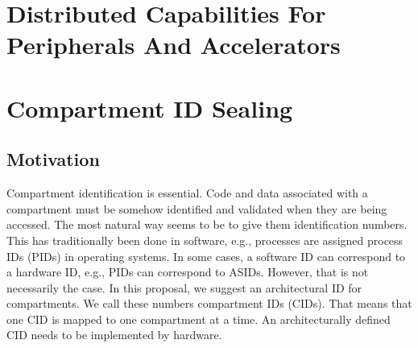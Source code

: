 \section{Distributed Capabilities For Peripherals And Accelerators} %




% 
% 
% 
% 
% 
% 
% 
% 
% 
% 



\section{Compartment ID Sealing} %

\subsection{Motivation}

Compartment identification is essential. Code and data associated with a compartment must be somehow identified and validated when they are being accessed.
The most natural way seems to be to give them identification numbers.
This has traditionally been done in software, e.g., processes are assigned process IDs (PIDs) in operating systems. In some cases, a software ID can correspond to a hardware ID, e.g., PIDs can correspond to ASIDs.
However, that is not necessarily the case. 
In this proposal, we suggest an architectural ID for compartments.
We call these numbers compartment IDs (CIDs). That means that one CID is mapped to one compartment at a time.
An architecturally defined CID needs to be implemented by hardware.

